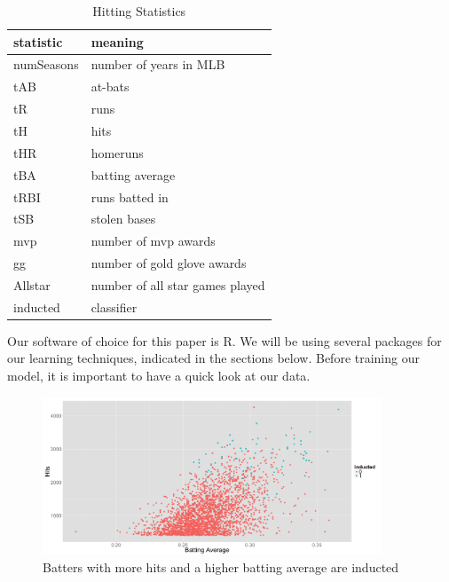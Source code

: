 \documentclass[preprint,12pt]{elsarticle}
\begin{document}
\begin{table}[h]
\centering
\begin{tabular}{|l | l|}
\hline
statistic & meaning \\
\hline
	numSeasons & number of years in MLB \\
	tAB & at-bats \\
	tR & runs \\
	tH & hits \\
	tHR & homeruns \\
	tBA & batting average \\
	tRBI & runs batted in \\
	tSB & stolen bases \\
	mvp & number of mvp awards \\
	gg & number of gold glove awards \\
	Allstar & number of all star games played \\
	inducted & classifier \\
\hline
\end{tabular}
\caption{Hitting Statistics}
\end{table}


Our software of choice for this paper is R. We will be using several packages for our learning techniques, indicated in the sections below. Before training our model, it is important to have a quick look at our data.

\begin{figure}[h]
	\centering
	\includegraphics[width=0.9\textwidth]{BAandHits}
	\caption{Batters with more hits and a higher batting average are inducted}
\end{figure}
\end{document}

